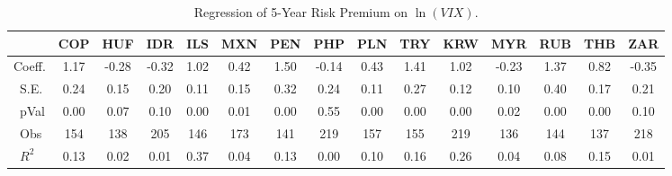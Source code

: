 \begin{table}
\centering
\begin{tabular}{l|cccccccccccccc}
\toprule
&\textbf{COP}&\textbf{HUF}&\textbf{IDR}&\textbf{ILS}&\textbf{MXN}&\textbf{PEN}&\textbf{PHP}&\textbf{PLN}&\textbf{TRY}&\textbf{KRW}&\textbf{MYR}&\textbf{RUB}&\textbf{THB}&\textbf{ZAR}\\\midrule
{ Coeff.}&1.17&-0.28&-0.32&1.02&0.42&1.50&-0.14&0.43&1.41&1.02&-0.23&1.37&0.82&-0.35\\\
{S.E.}&0.24&0.15&0.20&0.11&0.15&0.32&0.24&0.11&0.27&0.12&0.10&0.40&0.17&0.21\\\
{pVal}&0.00&0.07&0.10&0.00&0.01&0.00&0.55&0.00&0.00&0.00&0.02&0.00&0.00&0.10\\\
{Obs}&154&138&205&146&173&141&219&157&155&219&136&144&137&218\\\
{$R^2$}&0.13&0.02&0.01&0.37&0.04&0.13&0.00&0.10&0.16&0.26&0.04&0.08&0.15&0.01\\ \bottomrule
\end{tabular}
\\
\caption{Regression of 5-Year Risk Premium on $\ln (VIX)$.}\label{tab:rp_reg_lvix}
\end{table}